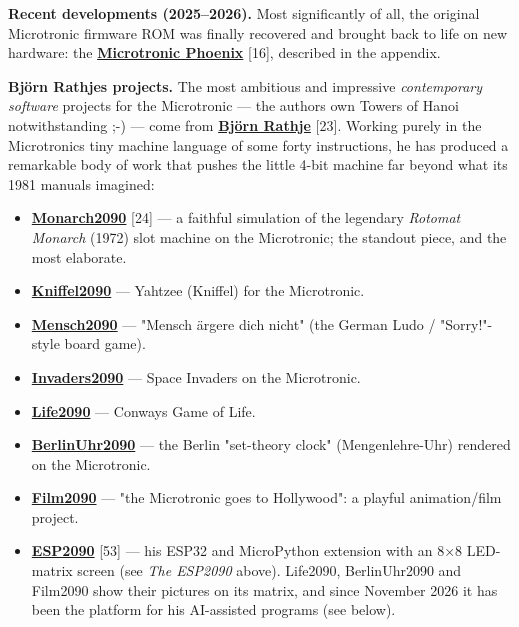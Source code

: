 \documentclass[
  11pt,
  letterpaper,
]{article}
\providecommand{\tightlist}{%
  \setlength{\itemsep}{0pt}\setlength{\parskip}{0pt}}
\begin{document}
\textbf{Recent developments (2025--2026).} Most significantly of all,
the original Microtronic firmware ROM was finally recovered and brought
back to life on new hardware: the
\href{https://github.com/lambdamikel/microtronic-phoenix}{\textbf{Microtronic
Phoenix}} {[}16{]}, described in the appendix.

\textbf{Björn Rathje\textquotesingle s projects.} The most ambitious and
impressive \emph{contemporary software} projects for the Microtronic ---
the author\textquotesingle s own Towers of Hanoi notwithstanding ;-) ---
come from \href{https://github.com/rab-berlin}{\textbf{Björn Rathje}}
{[}23{]}. Working purely in the Microtronic\textquotesingle s tiny
machine language of some forty instructions, he has produced a
remarkable body of work that pushes the little 4-bit machine far beyond
what its 1981 manuals imagined:

\begin{itemize}
\tightlist
\item
  \href{https://github.com/rab-berlin/Monarch2090}{\textbf{Monarch2090}}
  {[}24{]} --- a faithful simulation of the legendary \emph{Rotomat
  Monarch} (1972) slot machine on the Microtronic; the standout piece,
  and the most elaborate.
\item
  \href{https://github.com/rab-berlin/Kniffel2090}{\textbf{Kniffel2090}}
  --- Yahtzee (Kniffel) for the Microtronic.
\item
  \href{https://github.com/rab-berlin/Mensch2090}{\textbf{Mensch2090}}
  --- "Mensch ärgere dich nicht" (the German Ludo / "Sorry!"-style board
  game).
\item
  \href{https://github.com/rab-berlin/Invaders2090}{\textbf{Invaders2090}}
  --- Space Invaders on the Microtronic.
\item
  \href{https://github.com/rab-berlin/Life2090}{\textbf{Life2090}} ---
  Conway\textquotesingle s Game of Life.
\item
  \href{https://github.com/rab-berlin/BerlinUhr2090}{\textbf{BerlinUhr2090}}
  --- the Berlin "set-theory clock" (Mengenlehre-Uhr) rendered on the
  Microtronic.
\item
  \href{https://github.com/rab-berlin/Film2090}{\textbf{Film2090}} ---
  "the Microtronic goes to Hollywood": a playful animation/film project.
\item
  \href{https://github.com/rab-berlin/ESP2090}{\textbf{ESP2090}}
  {[}53{]} --- his ESP32 and MicroPython extension with an 8×8
  LED-matrix screen (see \emph{The ESP2090} above). Life2090,
  BerlinUhr2090 and Film2090 show their pictures on its matrix, and
  since November 2026 it has been the platform for his AI-assisted
  programs (see below).
\end{itemize}
\end{document}
